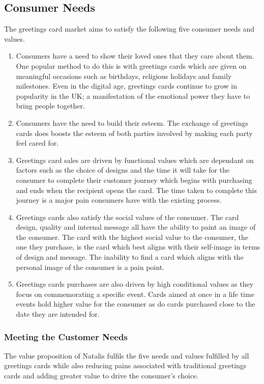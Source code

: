 \documentclass[10pt,a4paper]{article}
\begin{document}
\subsection*{Consumer Needs}
The greetings card market aims to satisfy the following five consumer needs and values.

\begin{enumerate}
	\item Consumers have a need to show their loved ones that they care about them. One popular method to do this is with greetings cards which are given on meaningful occasions such as birthdays, religious holidays and family milestones. Even in the digital age, greetings cards continue to grow in popularity in the UK; a manifestation of the emotional power they have to bring people together.
	\item Consumers have the need to build their esteem. The exchange of greetings cards does boosts the esteem of both parties involved by making each party feel cared for.
	\item Greetings card sales are driven by functional values which are dependant on factors such as the choice of designs and the time it will take for the consumer to complete their customer journey which begins with purchasing and ends when the recipient opens the card. The time taken to complete this journey is a major pain consumers have with the existing process.
	\item Greetings cards also satisfy the social values of the consumer. The card design, quality and internal message all have the ability to paint an image of the consumer. The card with the highest social value to the consumer, the one they purchase, is the card which best aligns with their self-image in terms of design and message. The inability to find a card which aligns with the personal image of the consumer is a pain point.
	\item Greetings cards purchases are also driven by high conditional values as they focus on commemorating a specific event. Cards aimed at once in a life time events hold higher value for the consumer as do cards purchased close to the date they are intended for.
\end{enumerate}

\subsubsection*{Meeting the Customer Needs}
The value proposition of Natalis fulfils the five needs and values fulfilled by all greetings cards while also reducing pains associated with traditional greetings cards and adding greater value to drive the consumer's choice.
\end{document}
